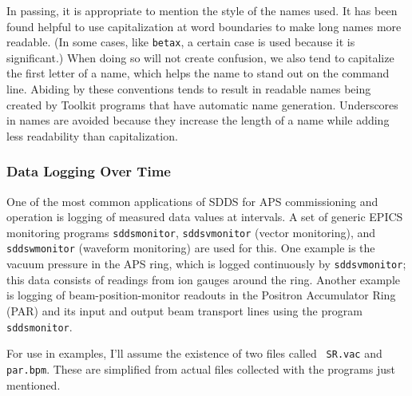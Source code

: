 \documentclass[11pt]{article}
\begin{document}
In passing, it is appropriate to mention the style of the names used.  It has been found helpful to use capitalization
at word boundaries to make long names more readable.  (In some cases, like {\tt betax}, a certain case is used because
it is significant.)  When doing so will not create confusion, we also tend to capitalize the first letter of a name,
which helps the name to stand out on the command line.  Abiding by these conventions tends to result in readable names
being created by Toolkit programs that have automatic name generation.  Underscores in names are avoided because they
increase the length of a name while adding less readability than capitalization.

\subsubsection{Data Logging Over Time}

One of the most common applications of SDDS for APS commissioning and
operation is logging of measured data values at intervals.  A set of
generic EPICS monitoring programs {\tt sddsmonitor}, {\tt sddsvmonitor}
(vector monitoring), and {\tt sddswmonitor} (waveform monitoring) are used
for this.  One example is the vacuum pressure in the APS ring, which is
logged continuously by {\tt sddsvmonitor}; this data consists of readings
from ion gauges around the ring.  Another example is logging of
beam-position-monitor readouts in the Positron Accumulator Ring (PAR) and
its input and output beam transport lines using the program {\tt
sddsmonitor}.

For use in examples, I'll assume the existence of two files called {\tt
SR.vac} and {\tt par.bpm}.  These are simplified from actual files
collected with the programs just mentioned.
 
\end{document}
